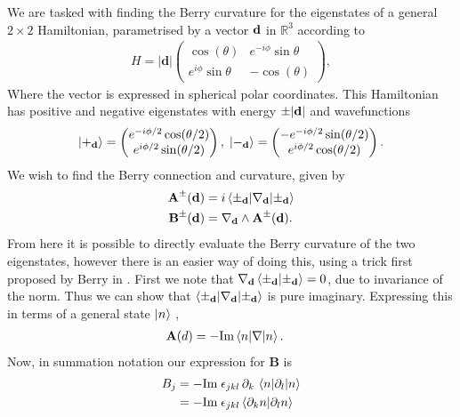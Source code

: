We are tasked with finding the Berry curvature for the eigenstates of a general $2 \times 2 $ Hamiltonian, parametrised by a vector $\bf d$ in $\mathbb R^3$ according to
\begin{align}
    H = |\textbf{d}|\begin{pmatrix}
\cos(\theta) &e^{-i\phi}\sin{\theta} \\ 
 e^{i\phi}\sin{\theta}& -\cos(\theta)
\end{pmatrix},
\end{align}
Where the vector is expressed in spherical polar coordinates. This Hamiltonian has positive and negative eigenstates with energy $\pm |\bf d |$ and wavefunctions
\begin{align}
    \ket{+_{\textbf{d}}} = \begin{pmatrix}
e^{-i\phi/2}\cos(\theta/2)\\ 
e^{i\phi/2} \sin(\theta/2)
\end{pmatrix},\; \ket{-_{\textbf{d}}} = \begin{pmatrix}
-e^{-i\phi/2}\sin(\theta/2)\\ 
e^{i\phi/2} \cos(\theta/2)
\end{pmatrix}.
\end{align}
We wish to find the Berry connection and curvature, given by
\begin{align}
    \textbf{A}^\pm (\bf d) &= i\braket{\pm_\textbf{d} | \nabla_\textbf{d}| \pm_\textbf{d}}\\
    \textbf{B}^{\pm}(\bf d ) &= \nabla_\textbf{d} \wedge \textbf{A}^\pm (\bf d).
\end{align}
From here it is possible to directly evaluate the Berry curvature of the two eigenstates, however there is an easier way of doing this, using a trick first proposed by Berry in \cite{berry_quantal_1984}. First we note that $ \nabla_\textbf{d} \braket{\pm_\textbf{d} | \pm_\textbf{d}} = 0$, due to invariance of the norm. Thus we can show that $\braket{\pm_\textbf{d} | \nabla_\textbf{d}| \pm_\textbf{d}}$ is pure imaginary. Expressing this in terms of a general state $\ket{n}$ ,
\begin{align}
    \textbf{A} (d) &= -\textup{Im} \braket{n | \nabla| n}.
\end{align}
Now, in summation notation our expression for $\textbf{B}$ is
\begin{align}
    B_j &= -\textup{Im}\;\epsilon_{jkl}\,\partial_k\, \braket{n | \partial_l| n}\\
    &=-\textup{Im}\; \epsilon_{jkl}\braket{\partial_k n|\partial_l n}
\end{align}
